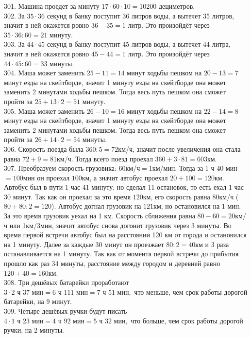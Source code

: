 \documentclass[12pt]{article}
\begin{document}
301. Машина проедет за минуту $17\cdot60\cdot10=10200$ дециметров.\\
302. За $35\cdot36$ секунд в банку поступит 36 литров воды, а вытечет 35 литров, значит в ней окажется ровно $36-35=1$ литр. Это произойдёт через $35\cdot36:60=21$ минуту.\\
303. За $44\cdot45$ секунд в банку поступит 45 литров воды, а вытечет 44 литра, значит в ней окажется ровно $45-44=1$ литр. Это произойдёт через $44\cdot45:60=33$ минуты.\\
304. Маша может заменить $25-11=14$ минут ходьбы пешком на $20-13=7$ минут езды на скейтборде, значит 1 минуту езды на скейтборде она может заменить 2 минутами ходьбы пешком. Тогда весь путь пешком она сможет пройти за $25+13\cdot2=51$ минуту.\\
305. Маша может заменить $26-10=16$ минут ходьбы пешком на $22-14=8$ минут езды на скейтборде, значит 1 минуту езды на скейтборде она может заменить 2 минутами ходьбы пешком. Тогда весь путь пешком она сможет пройти за $26+14\cdot2=54$ минуты.\\
306. Скорость поезда была $360:5=72$км/ч, значит после увеличения она стала равна $72+9=81$км/ч. Тогда всего поезд проехал $360+3\cdot81=603$км.\\
307. Преобразуем скорость грузовика: 60км/ч$=1$км/мин. Тогда за 1 ч 40 мин$=100$мин он проехал $100$км, а значит автобус проехал $20+100=120$км. Автобус был в пути 1 час 41 минуту, но сделал 11 остановок, то есть ехал 1 час 30 минут. Так как он проехал за это время $120$км, его скорость равна $80$км/ч ($80+80:2=120$). Автобус догнал грузовик на $121$км, но остановился на 1 мин. За это время грузовик уехал на 1 км. Скорость сближения равна $80-60=20$км/ч или 1км/3мин, значит автобус снова догонит грузовик через 3 минуты. Во время первой встречи автобус был на расстоянии 120 км от города и остановился на 1 минуту. Далее за каждые 30 минут он проезжает $80:2=40$км и 3 раза останавливается на 1 минуту. Так как от момента первой встречи до прибытия прошло как раз 34 минуты, расстояние между городом и деревней равно
$120+40=160$км.\\
308. Три дешёвых батарейки проработают $3\cdot2\text{ ч }37\text{ мин}=6\text{ ч } 111\text{ мин}=7\text{ ч }51\text{ мин},$ что меньше, чем срок работы дорогой батарейки, на 9 минут.\\
309. Четыре дешёвых ручки будут писать $4\cdot1\text{ ч }23\text{ мин}=4\text{ ч } 92\text{ мин}=5\text{ ч }32\text{ мин},$ что больше, чем срок работы дорогой ручки, на 2 минуты.\\
\end{document}
